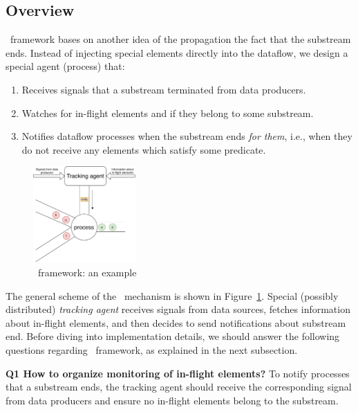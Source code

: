 \label{fs-acker-preliminaries}

\subsection{Overview}

\tracker\ framework bases on another idea of the propagation the fact that the substream ends. Instead of injecting special elements directly into the dataflow, we design a special agent (process) that:

\begin{enumerate}
    \item Receives signals that a substream terminated from data producers.
    \item Watches for in-flight elements and if they belong to some substream.
    \item Notifies dataflow processes when the substream ends {\em for them}, i.e., when they do not receive any elements which satisfy some predicate.
\end{enumerate}

\begin{figure}[htbp]
  \centering
  \includegraphics[width=0.35\textwidth]{pics/tracker-scheme.pdf}
  \caption{\tracker\ framework: an example}
  \label{tracker_scheme}
\end{figure}

The general scheme of the \tracker\ mechanism is shown in Figure~\ref{tracker_scheme}. Special (possibly distributed) {\em tracking agent} receives signals from data sources, fetches information about in-flight elements, and then decides to send notifications about substream end. Before diving into implementation details, we should answer the following questions regarding \tracker\ framework, as explained in the next subsection.

{\bf Q1 How to organize monitoring of in-flight elements?} To notify processes that a substream ends, the tracking agent should receive the corresponding signal from data producers and ensure no in-flight elements belong to the substream. 

